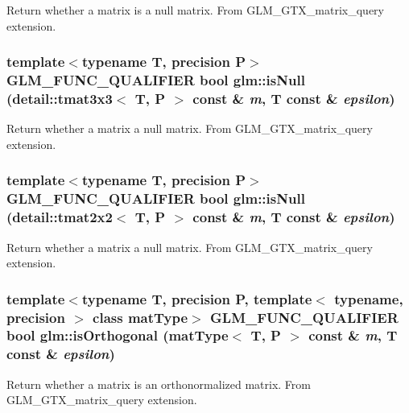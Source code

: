 Return whether a matrix is a null matrix. From GLM\_\-GTX\_\-matrix\_\-query extension. \hypertarget{group__gtx__matrix__query_ge3db03e8b4aea5dc381bc45d1d3935eb}{
\subsubsection[isNull]{\setlength{\rightskip}{0pt plus 5cm}template$<$typename T, precision P$>$ GLM\_\-FUNC\_\-QUALIFIER bool glm::isNull (detail::tmat3x3$<$ T, P $>$ const \& {\em m}, \/  T const \& {\em epsilon})}}
\label{group__gtx__matrix__query_ge3db03e8b4aea5dc381bc45d1d3935eb}


Return whether a matrix a null matrix. From GLM\_\-GTX\_\-matrix\_\-query extension. \hypertarget{group__gtx__matrix__query_g54401e84073257d2bab8680e207ef405}{
\subsubsection[isNull]{\setlength{\rightskip}{0pt plus 5cm}template$<$typename T, precision P$>$ GLM\_\-FUNC\_\-QUALIFIER bool glm::isNull (detail::tmat2x2$<$ T, P $>$ const \& {\em m}, \/  T const \& {\em epsilon})}}
\label{group__gtx__matrix__query_g54401e84073257d2bab8680e207ef405}


Return whether a matrix a null matrix. From GLM\_\-GTX\_\-matrix\_\-query extension. \hypertarget{group__gtx__matrix__query_gbaeee016acd42f7a58bd1de063a3061b}{
\subsubsection[isOrthogonal]{\setlength{\rightskip}{0pt plus 5cm}template$<$typename T, precision P, template$<$ typename, precision $>$ class matType$>$ GLM\_\-FUNC\_\-QUALIFIER bool glm::isOrthogonal (matType$<$ T, P $>$ const \& {\em m}, \/  T const \& {\em epsilon})}}
\label{group__gtx__matrix__query_gbaeee016acd42f7a58bd1de063a3061b}


Return whether a matrix is an orthonormalized matrix. From GLM\_\-GTX\_\-matrix\_\-query extension. 